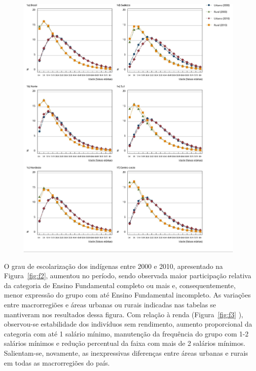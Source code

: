 \documentclass{article}
\begin{document}
\begin{figure}
\includegraphics[width=\textwidth]{1678-4464-csp-33-s1-e00085516-gf1.jpg}
\caption{}\label{fig:f1}
\end{figure}

O grau de escolarização dos indígenas entre 2000 e 2010, apresentado na Figura~\ref{fig:f2}, aumentou no período, sendo observada maior participação relativa da categoria
de Ensino Fundamental completo ou mais e, consequentemente, menor expressão do
grupo com até Ensino Fundamental incompleto. As variações entre macrorregiões e
áreas urbanas ou rurais indicadas nas tabelas se mantiveram nos resultados dessa
figura. Com relação à renda (Figura~\ref{fig:f3}
), observou-se estabilidade dos indivíduos sem rendimento, aumento proporcional
da categoria com até 1 salário mínimo, manutenção da frequência do grupo com 1-2
salários mínimos e redução percentual da faixa com mais de 2 salários mínimos.
Salientam-se, novamente, as inexpressivas diferenças entre áreas urbanas e
rurais em todas as macrorregiões do país.
\end{document}
